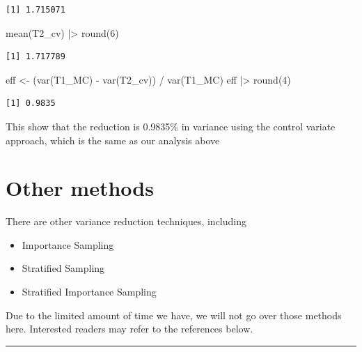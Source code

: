 \documentclass[
  letterpaper,
  DIV=11,
  numbers=noendperiod]{scrreprt}
\newenvironment{Shaded}{\begin{snugshade}}{\end{snugshade}}
\newcommand{\DecValTok}[1]{\textcolor[rgb]{0.68,0.00,0.00}{#1}}
\newcommand{\FunctionTok}[1]{\textcolor[rgb]{0.28,0.35,0.67}{#1}}
\newcommand{\NormalTok}[1]{\textcolor[rgb]{0.00,0.23,0.31}{#1}}
\newcommand{\OtherTok}[1]{\textcolor[rgb]{0.00,0.23,0.31}{#1}}
\newcommand{\SpecialCharTok}[1]{\textcolor[rgb]{0.37,0.37,0.37}{#1}}
\begin{document}
\begin{verbatim}
[1] 1.715071
\end{verbatim}

\begin{Shaded}
\begin{Highlighting}[]
\FunctionTok{mean}\NormalTok{(T2\_cv) }\SpecialCharTok{|\textgreater{}} \FunctionTok{round}\NormalTok{(}\DecValTok{6}\NormalTok{)}
\end{Highlighting}
\end{Shaded}

\begin{verbatim}
[1] 1.717789
\end{verbatim}

\begin{Shaded}
\begin{Highlighting}[]
\NormalTok{eff }\OtherTok{\textless{}{-}}\NormalTok{ (}\FunctionTok{var}\NormalTok{(T1\_MC) }\SpecialCharTok{{-}} \FunctionTok{var}\NormalTok{(T2\_cv)) }\SpecialCharTok{/} \FunctionTok{var}\NormalTok{(T1\_MC)}
\NormalTok{eff }\SpecialCharTok{|\textgreater{}} \FunctionTok{round}\NormalTok{(}\DecValTok{4}\NormalTok{)}
\end{Highlighting}
\end{Shaded}

\begin{verbatim}
[1] 0.9835
\end{verbatim}

This show that the reduction is 0.9835\% in variance using the control
variate approach, which is the same as our analysis above

\section{Other methods}\label{other-methods}

There are other variance reduction techniques, including

\begin{itemize}
\item
  Importance Sampling
\item
  Stratified Sampling
\item
  Stratified Importance Sampling
\end{itemize}

Due to the limited amount of time we have, we will not go over those
methods here. Interested readers may refer to the references below.

\begin{center}\rule{0.5\linewidth}{0.5pt}\end{center}
\end{document}
